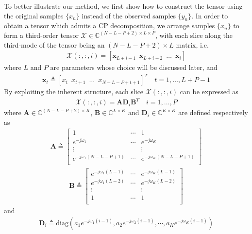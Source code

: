 \documentclass[10pt,journal,epsfig]{IEEEtran}
\begin{document}
To better illustrate our method, we first show how to construct
the tensor using the original samples $\{x_n\}$ instead of the
observed samples $\{y_n\}$. In order to obtain a tensor which
admits a CP decomposition, we arrange samples $\{x_n\}$ to form a
third-order tensor
$\boldsymbol{\mathcal{X}}\in\mathbb{C}^{(N-L-P+2)\times L\times
P}$, with each slice along the third-mode of the tensor being an
$(N-L-P+2)\times L$ matrix, i.e.
\begin{align}
\boldsymbol{\mathcal{X}}(:,:,i)=[\boldsymbol{x}_{L+i-1}\phantom{0}\boldsymbol{x}_{L+i-2}\phantom{0}
\dots\phantom{0}\boldsymbol{x}_i]
\end{align}
where $L$ and $P$ are parameters whose choice will be discussed
later, and
\begin{align}
\boldsymbol{x}_t\triangleq
[x_t\phantom{0}x_{t+1}\phantom{0}\dots\phantom{0}x_{N-L-P+t+1}]^T
\quad t=1,\dots,L+P-1
\end{align}
By exploiting the inherent structure, each slice
$\boldsymbol{\mathcal{X}}(:,:,i)$ can be expressed as
\begin{align}
\boldsymbol{\mathcal{X}}(:,:,i)=\boldsymbol{A}\boldsymbol{D}_i\boldsymbol{B}^T
\quad i=1,\dots,P
\end{align}
where $\boldsymbol{A}\in\mathbb{C}^{(N-L-P+2)\times K}$,
$\boldsymbol{B}\in\mathbb{C}^{L\times K}$ and
$\boldsymbol{D}_i\in\mathbb{C}^{K\times K}$ are defined
respectively as
\begin{align}
\boldsymbol{A}\triangleq\begin{bmatrix}
1 & \cdots & 1\\
e^{-j\omega_1} & \cdots & e^{-j\omega_K}\\
\vdots&&\vdots\\
e^{-j\omega_1 (N-L-P+1)} & \cdots & e^{-j\omega_K (N-L-P+1)}\\
\end{bmatrix}
\end{align}
\begin{align}
\boldsymbol{B}\triangleq\begin{bmatrix}
e^{-j\omega_1 (L-1)} & \cdots & e^{-j\omega_K (L-1)}\\
e^{-j\omega_1 (L-2)} & \cdots & e^{-j\omega_K (L-2)}\\
\vdots&&\vdots\\
1 & \cdots & 1\\
\end{bmatrix}
\end{align}
and
\begin{align}
\boldsymbol{D}_i \triangleq \text{diag}(a_1 e^{-j\omega_1
(i-1)},a_2 e^{-j\omega_2 (i-1)},\cdots, a_K e^{-j\omega_K (i-1)})
\end{align}
\end{document}
